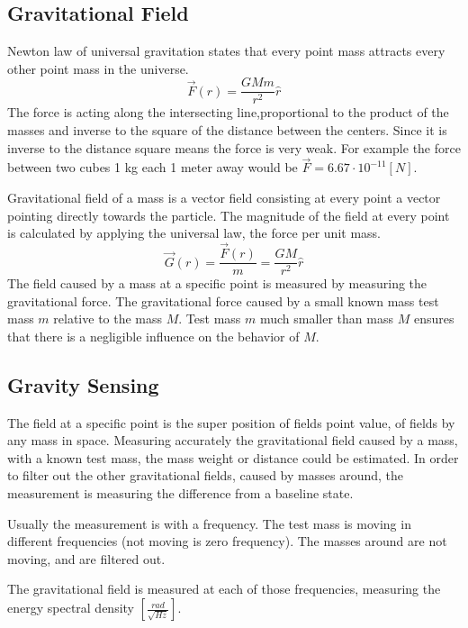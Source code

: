 \documentclass[\main/master.tex]{subfiles}
\begin{document}
\subsection{Gravitational Field}
Newton law of universal gravitation states that every point mass attracts every other point mass in the universe.
\begin{equation}
\overrightarrow{F}(r) = \frac{GMm}{r^2}\hat{r}    \label{eqn:gravitation_force}
\end{equation} 
The force is acting along the intersecting line,proportional to the product of the masses and inverse to the square of the distance between the centers. Since it is inverse to the distance square means the force is very weak. For example the force between two cubes 1 kg each 1 meter away would be $\overrightarrow{F} = 6.67\cdot10^{-11} [N]$.
\par
Gravitational field of a mass is a vector field consisting at every point a vector pointing directly towards the particle. The magnitude of the field at every point is calculated by applying the universal law, the force per unit mass. 
\begin{equation}
\overrightarrow{G}(r) = \frac{\overrightarrow{F}(r)}{m} = \frac{GM}{r^2}\hat{r}    \label{eqn:gravitation_field}
\end{equation}
The field caused by a mass at a specific point is measured by measuring the gravitational force. The gravitational force caused by a small known mass test mass $m$ relative to the mass $M$. Test mass $m$ much smaller than mass $M$ ensures that there is a negligible influence on the behavior of $M$.  

\subsection{Gravity Sensing}
The field at a specific point is the super position of fields point value, of fields by any mass in space. Measuring accurately the gravitational field caused by a mass, with a known test mass, the mass weight or distance could be estimated. In order to filter out the other gravitational fields, caused by masses around, the measurement is measuring the difference from a baseline state.
\par
Usually the measurement is with a frequency. The test mass is moving in different frequencies (not moving is zero frequency). The masses around are not moving, and are filtered out.
\par
The gravitational field is measured at each of those frequencies, measuring the energy spectral density $[\frac{rad}{\sqrt{Hz}}]$.
\end{document}
